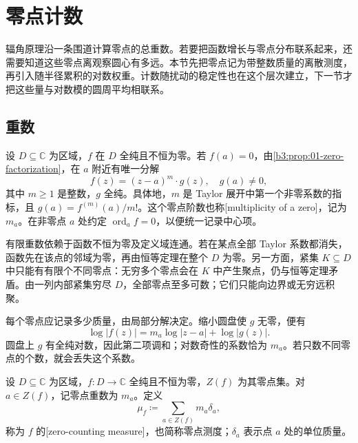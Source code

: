 \section{零点计数}
\label{b3:sec:1801}

辐角原理沿一条围道计算零点的总重数。若要把函数增长与零点分布联系起来，还需要知道这些零点离观察圆心有多远。本节先把零点记为带整数质量的离散测度，再引入随半径累积的对数权重。计数随扰动的稳定性也在这个层次建立，下一节才把这些量与对数模的圆周平均相联系。

\subsection{重数}
\label{b3:subsec:180101}

设 \(D\subseteq\mathbb C\) 为区域，\(f\) 在 \(D\) 全纯且不恒为零。若 \(f(a)=0\)，由\cref{b3:prop:01-zero-factorization}，在 \(a\) 附近有唯一分解
\[
 f(z)=(z-a)^m\cdot g(z),\quad g(a)\ne0,
\]
其中 \(m\ge1\) 是整数，\(g\) 全纯。具体地，\(m\) 是 Taylor 展开中第一个非零系数的指标，且 \(g(a)=f^{(m)}(a)/m!\)。这个零点阶数也称[multiplicity of a zero]，记为 \(m_a\)。在非零点 \(a\) 处约定 \(\operatorname{ord}_a f=0\)，以便统一记录中心项。

\ProseParagraphBreak

有限重数依赖于函数不恒为零及定义域连通。若在某点全部 Taylor 系数都消失，函数先在该点的邻域为零，再由恒等定理在整个 \(D\) 为零。另一方面，紧集 \(K\subseteq D\) 中只能有有限个不同零点：无穷多个零点会在 \(K\) 中产生聚点，仍与恒等定理矛盾。由一列内部紧集穷尽 \(D\)，全部零点至多可数；它们只能向边界或无穷远积聚。

\ProseParagraphBreak

每个零点应记录多少质量，由局部分解决定。缩小圆盘使 \(g\) 无零，便有
\[
 \log|f(z)|=m_a\log|z-a|+\log|g(z)|.
\]
圆盘上 \(g\) 有全纯对数，因此第二项调和；对数奇性的系数恰为 \(m_a\)。若只数不同零点的个数，就会丢失这个系数。

\begin{definition}[零点计数测度]\label{b3:def:18-zero-counting-measure}
设 \(D\subseteq\mathbb C\) 为区域，\(f:D\to\mathbb C\) 全纯且不恒为零，\(Z(f)\) 为其零点集。对 \(a\in Z(f)\)，记零点重数为 \(m_a\)。定义
\[
 \mu_f\coloneqq\sum_{a\in Z(f)}m_a\delta_a,
\]
称为 \(f\) 的[zero-counting measure]，也简称零点测度；\(\delta_a\) 表示点 \(a\) 处的单位质量。
\end{definition}

